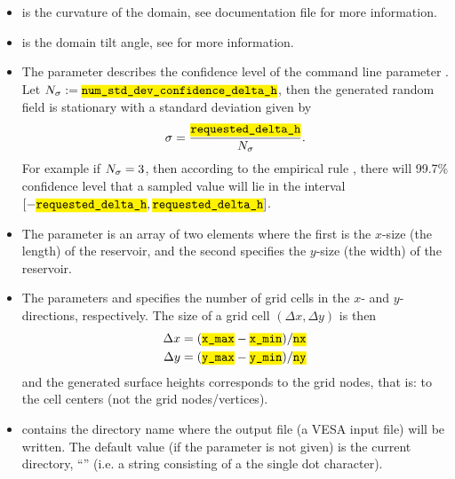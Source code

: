 \documentclass[11pt,a4paper]{amsart}
\begin{document}
\begin{itemize}

\item {} is the curvature of the domain, see
  documentation file \docSetup{} for more information. 

\item {} is the domain tilt angle, see
  \docSetup{} for more information. 

\item The parameter  describes
  the confidence level of the command line parameter \paramAmp{}.
  Let $N_{\stdev} := \jsonParam{num\_std\_dev\_confidence\_delta\_h}$, then
  the generated random field is stationary with a standard
  deviation given by
  \begin{align*}
    \sigma = \frac{\paramAmp}{N_{\stdev}}.
  \end{align*}
  For example if $N_{\sigma} = 3$, then according to the empirical
rule \cite{wik18:ers}, there will 99.7\% confidence level that a sampled value
will lie in the interval $[-\paramAmp, \paramAmp]$.

\item  The parameter  is an array of two
    elements where the first is the $x$-size (the length) of the reservoir, and the
    second specifies the $y$-size (the width) of the reservoir.

\item The parameters  and   specifies the number
    of grid cells in the $x$- and $y$-directions, respectively. The size of a
    grid cell $(\Delta x, \Delta y)$ is then
    \begin{align*}
      \label{eq:4}
      \Delta x = (\jsonParam{x\_max} - \jsonParam{x\_min})/ \jsonParam{nx}\\
      \Delta y = (\jsonParam{y\_max} - \jsonParam{y\_min})/ \jsonParam{ny}
    \end{align*}
    and the generated surface heights corresponds to the grid nodes, that is:
    to the cell centers (not the grid nodes/vertices).

\item {} contains the directory name where the output
  file  (a VESA input file) will be written. The default
  value (if the parameter 
  is not given) is 
  the current directory, ``'' (i.e. a string consisting of a the single
  dot character). 


\end{itemize}
\end{document}
